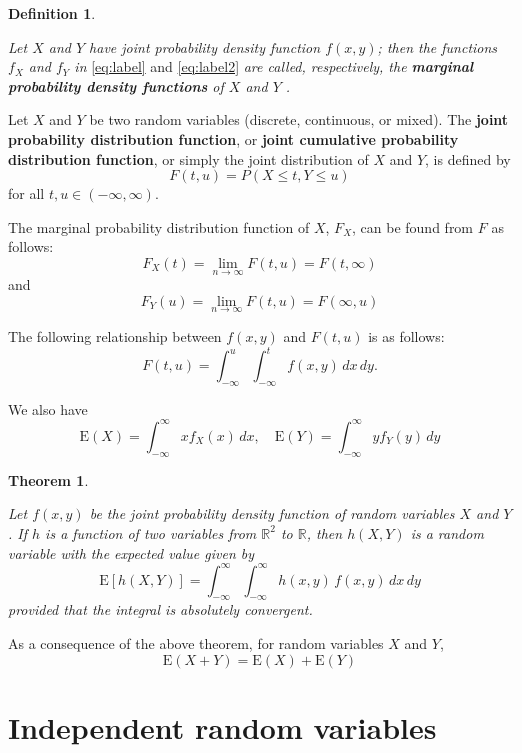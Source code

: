 \documentclass[landscape, 20pt]{extreport}
\newtheorem{theorem}{Theorem}[chapter]
\theoremstyle{definition}
\newtheorem{definition}{Definition}[chapter]
\theoremstyle{definition}
\theoremstyle{definition}
\theoremstyle{definition}
\theoremstyle{remark}
\begin{document}
\begin{definition}
\protect\hypertarget{def:unlabeled-div-19}{}\label{def:unlabeled-div-19}

\emph{Let \(X\) and \(Y\) have joint probability density
function \(f (x, y)\); then the functions \(f_X\) and \(f_Y\) in} \eqref{eq:label} and \eqref{eq:label2}
\emph{are called,
respectively, the \textbf{marginal probability density functions} of \(X\) and
\(Y\) .}

\end{definition}

Let \(X\) and \(Y\) be two random variables (discrete, continuous, or
mixed). The \textbf{joint probability distribution function}, or \textbf{joint
cumulative probability distribution function}, or simply the joint
distribution of \(X\) and \(Y\), is defined by
\[F(t, u) = P(X \le t, Y \le u)\] for all \(t, u \in (-\infty, \infty)\).

The marginal probability distribution function of \(X\), \(F_X\), can be
found from \(F\) as follows:
\[F_X(t) = \lim_{n \rightarrow \infty} F(t,u)  = F(t, \infty)\] and
\[F_Y(u) = \lim_{n \rightarrow \infty}F(t,u)  = F( \infty, u)\]

The following relationship between \(f(x,y)\) and \(F(t,u)\) is as follows:
\[F(t,u) = \int_{-\infty}^{u}\int_{-\infty}^{t} f(x,y)\, dx\, dy.\]

We also have
\[\mathrm{E}(X) =   \int_{-\infty}^\infty x f_X(x)\, dx , \quad \mathrm{E}(Y) =   \int_{-\infty}^\infty y f_Y(y)\, dy\]

\begin{theorem}
\protect\hypertarget{thm:unlabeled-div-20}{}\label{thm:unlabeled-div-20}

\emph{Let \(f (x, y)\) be the joint probability density function
of random variables \(X\) and \(Y\). If \(h\) is a function of two variables
from \(\mathbb{R}^2\) to \(\mathbb{R}\), then \(h(X, Y )\) is a random
variable with the expected value given by
\[\mathrm{E}[h(X,Y)] = \int_{-\infty}^{\infty}\int_{-\infty}^{\infty} h(x,y) \, f(x,y)\, dx\, dy\]
provided that the integral is absolutely convergent.}

\end{theorem}

As a consequence of the above theorem, for random variables \(X\) and \(Y\),
\[\mathrm{E}(X + Y) = \mathrm{E}(X) + \mathrm{E}(Y)\]

\hypertarget{independent-random-variables}{%
\section{Independent random variables}\label{independent-random-variables}}
\end{document}
